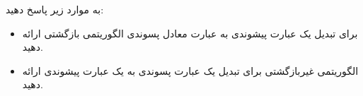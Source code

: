 به موارد زیر پاسخ دهید:
\begin{itemize}
\item 
 برای تبدیل یک عبارت پیشوندی به عبارت معادل پسوندی الگوریتمی بازگشتی ارائه دهید.

\item 
الگوریتمی غیربازگشتی برای تبدیل یک عبارت پسوندی به یک عبارت پیشوندی ارائه دهید.

\end{itemize}
